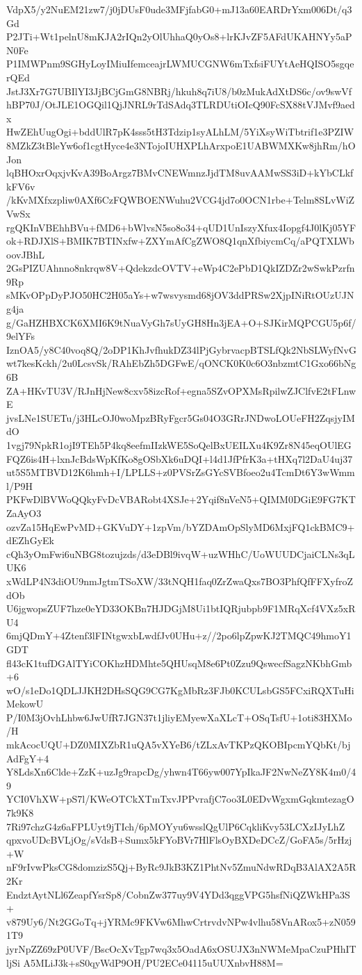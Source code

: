 VdpX5/y2NuEM21zw7/j0jDUsF0ude3MFjfabG0+mJ13a60EARDrYxm006Dt/q3Gd
P2JTi+Wt1pelnU8mKJA2rIQn2yOlUhhaQ0yOs8+lrKJvZF5AFdUKAHNYy5aPN0Fe
P1IMWPnm9SGHyLoyIMiuIfemceajrLWMUCGNW6mTxfsiFUYtAeHQISO5sgqerQEd
JstJ3Xr7G7UBIlYI3JjBCjGmG8NBRj/hkuh8q7iU8/b0zMukAdXtDS6c/ov9swVf
hBP70J/OtJLE1OGQil1QjJNRL9rTdSAdq3TLRDUtiOIcQ90FcSX88tVJMvf9aedx
HwZEhUugOgi+bddUlR7pK4sss5tH3Tdzip1syALhLM/5YiXsyWiTbtrif1e3PZIW
8MZkZ3tBleYw6of1cgtHyce4e3NTojoIUHXPLhArxpoE1UABWMXKw8jhRm/hOJon
lqBHOxrOqxjvKvA39BoArgz7BMvCNEWmnzJjdTM8uvAAMwSS3iD+kYbCLkfkFV6v
/kKvMXfxzpliw0AXf6CzFQWBOENWuhu2VCG4jd7o0OCN1rbe+Telm8SLvWiZVwSx
rgQKInVBEhhBVu+fMD6+bWlvsN5so8o34+qUD1UnIszyXfux4Iopgf4J0lKj05YF
ok+RDJXlS+BMIK7BTINxfw+ZXYmAfCgZWO8Q1qnXfbiycmCq/aPQTXLWboovJBhL
2GsPIZUAhnno8nkrqw8V+QdekzdcOVTV+eWp4C2ePbD1QkIZDZr2wSwkPzrfn9Rp
sMKvOPpDyPJO50HC2H05aYs+w7wsvysmd68jOV3ddPRSw2XjpINiRtOUzUJNg4ja
g/GaHZHBXCK6XMI6K9tNuaVyGh7sUyGH8Hn3jEA+O+SJKirMQPCGU5p6f/9elYFs
IznOA5/y8C40voq8Q/2oDP1KhJvfhukDZ34lPjGybrvacpBTSLfQk2NbSLWyfNvG
wt7kesKckh/2u0LcsvSk/RAhEbZh5DGFwE/qONCK0K0c6O3nbzmtC1Gxo66bNg6B
ZA+HKvTU3V/RJnHjNew8cxv58izcRof+egna5SZvOPXMsRpilwZJClfvE2tFLnwE
jvsLNe1SUETu/j3HLcOJ0woMpzBRyFgcr5Gs04O3GRrJNDwoLOUeFH2ZqsjyIMdO
1vgj79NpkR1ojI9TEh5P4kq8eefmIIzkWE5SoQelBxUEILXu4K9Zr8N45eqOUlEG
FQZ6is4H+lxnJcBdsWpKfKo8gOSbXk6uDQI+l4d1JfPfrK3a+tHXq7l2DaU4uj37
ut5S5MTBVD12K6hmh+I/LPLLS+z0PVSrZsGYcSVBfoeo2u4TcmDt6Y3wWmml/P9H
PKFwDlBVWoQQkyFvDcVBARobt4XSJe+2Yqif8nVeN5+QIMM0DGiE9FG7KTZaAyO3
ozvZa15HqEwPvMD+GKVuDY+1zpVm/bYZDAmOpSlyMD6MxjFQ1ckBMC9+dEZhGyEk
cQh3yOmFwi6uNBG8tozujzds/d3eDBl9ivqW+uzWHhC/UoWUUDCjaiCLNs3qLUK6
xWdLP4N3diOU9nmJgtmTSoXW/33tNQH1faq0ZrZwaQxs7BO3PhfQfFFXyfroZdOb
U6jgwopsZUF7hze0eYD33OKBn7HJDGjM8Ui1btIQRjubpb9F1MRqXcf4VXz5xRU4
6mjQDmY+4Ztenf3lFINtgwxbLwdfJv0UHu+z//2po6lpZpwKJ2TMQC49hmoY1GDT
fl43cK1tufDGAlTYiCOKhzHDMhte5QHUsqM8e6Pt0Zzu9QswecfSagzNKbhGmb+6
wO/s1eDo1QDLJJKH2DHsSQG9CG7KgMbRz3FJb0KCULsbGS5FCxiRQXTuHiMekowU
P/I0M3jOvhLhbw6JwUfR7JGN37t1jliyEMyewXaXLcT+OSqTsfU+1oti83HXMo/H
mkAcocUQU+DZ0MIXZbR1uQA5vXYeB6/tZLxAvTKPzQKOBIpcmYQbKt/bjAdFgY+4
Y8LdsXn6Clde+ZzK+uzJg9rapcDg/yhwn4T66yw007YpIkaJF2NwNeZY8K4m0/49
YCI0VhXW+pS7l/KWeOTCkXTmTxvJPPvrafjC7oo3L0EDvWgxmGqkmtezagO7k9K8
7Ri97chzG4z6aFPLUyt9jTIch/6pMOYyu6wsslQgUlP6CqkliKvy53LCXzIJyLhZ
qpxvoUDcBVLjOg/sVdsB+Sumx5kFYoBVr7HlFlsOyBXDeDCcZ/GoFA5s/5rHzj+W
nF9rIvwPksCG8domzizS5Qj+ByRc9JkB3KZ1PhtNv5ZmuNdwRDqB3AlAX2A5R2Kr
EndztAytNLl6ZeapfYsrSp8/CobnZw377uy9V4YDd3qggVPG5hsfNiQZWkHPa3S+
v879Uy6/Nt2GGoTq+jYRMc9FKVw6MhwCrtrvdvNPw4vlhu58VnARox5+zN0591T9
jyrNpZZ69zP0UVF/BscOcXvTgp7wq3x5OadA6xOSUJX3nNWMeMpaCzuPHhITljSi
A5MLiJ3k+sS0qyWdP9OH/PU2ECe04115uUUXnbvH88M=
